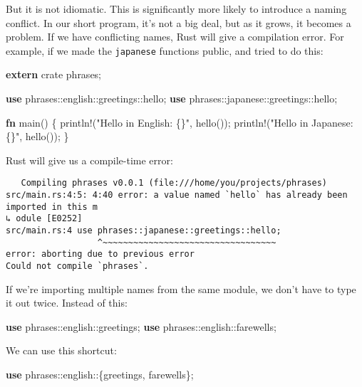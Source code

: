 \documentclass[a4paper,]{book}
\newenvironment{Shaded}{\begin{snugshade}}{\end{snugshade}}
\newcommand{\KeywordTok}[1]{\textcolor[rgb]{0.13,0.29,0.53}{\textbf{{#1}}}}
\newcommand{\StringTok}[1]{\textcolor[rgb]{0.31,0.60,0.02}{{#1}}}
\newcommand{\OtherTok}[1]{\textcolor[rgb]{0.56,0.35,0.01}{{#1}}}
\newcommand{\NormalTok}[1]{{#1}}
\begin{document}
But it is not idiomatic. This is significantly more likely to introduce
a naming conflict. In our short program, it's not a big deal, but as it
grows, it becomes a problem. If we have conflicting names, Rust will
give a compilation error. For example, if we made the \texttt{japanese}
functions public, and tried to do this:

\begin{Shaded}
\begin{Highlighting}[]
\KeywordTok{extern} \NormalTok{crate phrases;}

\KeywordTok{use} \NormalTok{phrases::english::greetings::hello;}
\KeywordTok{use} \NormalTok{phrases::japanese::greetings::hello;}

\KeywordTok{fn} \NormalTok{main() \{}
    \OtherTok{println!}\NormalTok{(}\StringTok{"Hello in English: \{\}"}\NormalTok{, hello());}
    \OtherTok{println!}\NormalTok{(}\StringTok{"Hello in Japanese: \{\}"}\NormalTok{, hello());}
\NormalTok{\}}
\end{Highlighting}
\end{Shaded}

Rust will give us a compile-time error:

\begin{verbatim}
   Compiling phrases v0.0.1 (file:///home/you/projects/phrases)
src/main.rs:4:5: 4:40 error: a value named `hello` has already been imported in this m
↳ odule [E0252]
src/main.rs:4 use phrases::japanese::greetings::hello;
                  ^~~~~~~~~~~~~~~~~~~~~~~~~~~~~~~~~~~
error: aborting due to previous error
Could not compile `phrases`.
\end{verbatim}

If we're importing multiple names from the same module, we don't have to
type it out twice. Instead of this:

\begin{Shaded}
\begin{Highlighting}[]
\KeywordTok{use} \NormalTok{phrases::english::greetings;}
\KeywordTok{use} \NormalTok{phrases::english::farewells;}
\end{Highlighting}
\end{Shaded}

We can use this shortcut:

\begin{Shaded}
\begin{Highlighting}[]
\KeywordTok{use} \NormalTok{phrases::english::\{greetings, farewells\};}
\end{Highlighting}
\end{Shaded}
\end{document}
